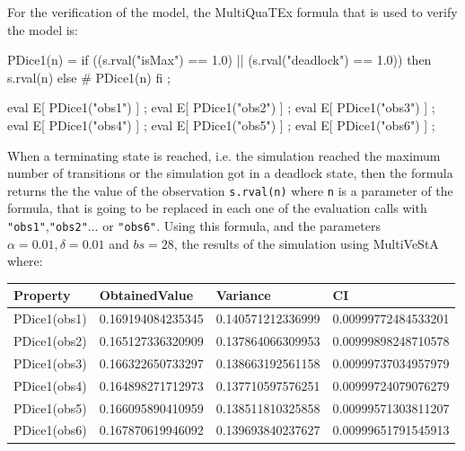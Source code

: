 For the verification of the model, the MultiQuaTEx formula that is used to verify the model is:
\begin{maude2}

PDice1(n) = if ((s.rval("isMax") == 1.0) || (s.rval("deadlock") == 1.0)) 
            then s.rval(n) else # PDice1(n) fi ;

eval E[ PDice1("obs1") ] ;
eval E[ PDice1("obs2") ] ;
eval E[ PDice1("obs3") ] ;
eval E[ PDice1("obs4") ] ;
eval E[ PDice1("obs5") ] ;
eval E[ PDice1("obs6") ] ;
\end{maude2}
When a terminating state is reached, i.e. the simulation reached the maximum number of transitions or the simulation got in a deadlock state, then the formula returns the the value of the observation \texttt{s.rval(n)} where \texttt{n} is a parameter of the formula, that is going to be replaced in each one of the evaluation calls with \texttt{"obs1"},\texttt{"obs2"}... or \texttt{"obs6"}. Using this formula, and the parameters $\alpha = 0.01, \delta = 0.01$ and $bs = 28$, the results of the simulation using MultiVeStA where:
\begin{table}[H]
\centering
\begin{tabular}{|l|l|l|l|}
\hline
Property     & ObtainedValue     & Variance          & CI                  \\ \hline
PDice1(obs1) & 0.169194084235345 & 0.140571212336999 & 0.00999772484533201 \\ \hline
PDice1(obs2) & 0.165127336320909 & 0.137864066309953 & 0.00999898248710578 \\ \hline
PDice1(obs3) & 0.166322650733297 & 0.138663192561158 & 0.00999737034957979 \\ \hline
PDice1(obs4) & 0.164898271712973 & 0.137710597576251 & 0.00999724079076279 \\ \hline
PDice1(obs5) & 0.166095890410959 & 0.138511810325858 & 0.00999571303811207 \\ \hline
PDice1(obs6) & 0.167870619946092 & 0.139693840237627 & 0.00999651791545913 \\ \hline
\end{tabular}
\end{table}

